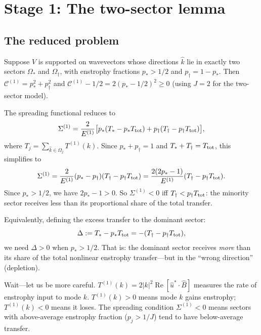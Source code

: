 \documentclass[11pt]{article}
\theoremstyle{definition}
\newcommand{\cC}{\mathcal{C}}
\DeclareMathOperator{\re}{Re}
\begin{document}
\section{Stage 1: The two-sector lemma}

\subsection{The reduced problem}

Suppose $V$ is supported on wavevectors
whose directions $\hat k$ lie in exactly two
sectors $\Omega_*$ and $\Omega_\dagger$, with
enstrophy fractions $p_*>1/2$ and
$p_\dagger = 1-p_*$.  Then
$\cC^{(1)} = p_*^2 + p_\dagger^2$ and
$\cC^{(1)}-1/2 = 2(p_*-1/2)^2\geq 0$
(using $J=2$ for the two-sector model).

The spreading functional reduces to
\begin{equation}\label{eq:Sigma-2sector}
\Sigma^{(1)} = \frac{2}{E^{(1)}}
\bigl[p_*(T_*-p_*T_{\rm tot})
+ p_\dagger(T_\dagger - p_\dagger T_{\rm tot})\bigr],
\end{equation}
where $T_j = \sum_{\hat k\in\Omega_j}T^{(1)}(k)$.
Since $p_*+p_\dagger=1$ and
$T_*+T_\dagger = T_{\rm tot}$, this simplifies to
\begin{equation}\label{eq:Sigma-simple}
\Sigma^{(1)} = \frac{2}{E^{(1)}}
(p_*-p_\dagger)(T_\dagger - p_\dagger T_{\rm tot})
= \frac{2(2p_*-1)}{E^{(1)}}
(T_\dagger - p_\dagger T_{\rm tot}).
\end{equation}
Since $p_*>1/2$, we have $2p_*-1>0$.
So $\Sigma^{(1)}<0$ iff
$T_\dagger < p_\dagger T_{\rm tot}$:
the minority sector receives less than its
proportional share of the total transfer.

Equivalently, defining the excess transfer
to the dominant sector:
\begin{equation}
\Delta := T_* - p_* T_{\rm tot}
= -(T_\dagger - p_\dagger T_{\rm tot}),
\end{equation}
we need $\Delta > 0$ when $p_* > 1/2$.
That is: the dominant sector receives
\emph{more} than its share of the total
nonlinear enstrophy transfer---but in the
``wrong direction'' (depletion).

Wait---let us be more careful.
$T^{(1)}(k) = 2|k|^2\re[\hat u^*\cdot\hat B]$
measures the rate of enstrophy input to mode $k$.
$T^{(1)}(k)>0$ means mode $k$ gains enstrophy;
$T^{(1)}(k)<0$ means it loses.  The spreading
condition $\Sigma^{(1)}<0$ means sectors with
above-average enstrophy fraction ($p_j > 1/J$)
tend to have below-average transfer.
\end{document}
